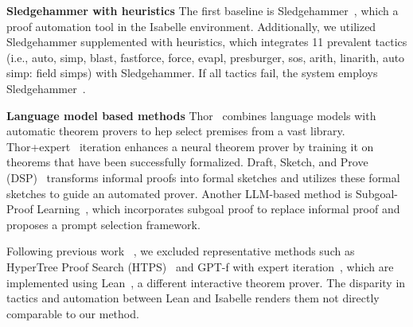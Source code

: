 \documentclass{article} \usepackage{iclr2024_conference,times}
\begin{document}
\textbf{Sledgehammer with heuristics} The first baseline is Sledgehammer~\citep{paulson2010three}, which a proof automation tool in the Isabelle environment. Additionally, we utilized Sledgehammer supplemented with heuristics, which integrates 11 prevalent tactics (i.e., auto, simp, blast, fastforce, force, evapl, presburger, sos, arith, linarith, auto simp: field simps) with Sledgehammer. If all tactics fail, the system employs Sledgehammer~\citep{jiang2023draft}.

\textbf{Language model based methods}  Thor~\citep{jiang2022thor} combines language models with automatic theorem provers to hep select premises from a vast library. Thor+expert~\citep{wu2022autoformalization} iteration enhances a neural theorem prover by training it on theorems that have been successfully formalized. Draft, Sketch, and Prove (DSP)~\citep{jiang2023draft} transforms informal proofs into formal sketches and utilizes these formal sketches to guide an automated prover. Another LLM-based method is Subgoal-Proof Learning~\citep{zhao2023decomposing}, which incorporates subgoal proof to replace informal proof and proposes a prompt selection framework.

Following previous work ~\citep{jiang2023draft,zhao2023decomposing}, we excluded representative methods such as HyperTree Proof Search (HTPS)~\citep{lample2022hypertree} and GPT-f with expert iteration~\citep{polu2023formal}, which are implemented using Lean~\cite{de2015lean}, a different interactive theorem prover. The disparity in tactics and automation between Lean and Isabelle renders them not directly comparable to our method.

\clearpage
\end{document}
